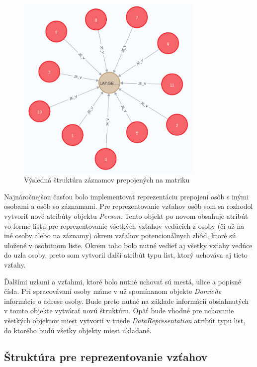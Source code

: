 \begin{figure}[H]
    \centering
    \includegraphics[width=0.8\textwidth]{obrazky-figures/matrika.png}
    \caption{Výsledná štruktúra záznamov prepojených na matriku}
    \label{matrika}
\end{figure}

Najnáročnejšou časťou bolo implementovať reprezentáciu prepojení osôb s inými osobami a osôb so záznamami. Pre reprezentovanie vzťahov osôb som sa rozhodol vytvoriť nové atribúty objektu \textit{Person}. Tento objekt po novom obsahuje atribút vo forme listu pre reprezentovanie všetkých vzťahov vedúcich z osoby (či už na iné osoby alebo na záznamy) okrem vzťahov potencionálnych zhôd, ktoré sú uložené v osobitnom liste. Okrem toho bolo nutné vedieť aj všetky vzťahy vedúce do uzla osoby, preto som vytvoril ďalší atribút typu list, ktorý uchováva aj tieto vzťahy.

Ďalšími uzlami a vzťahmi, ktoré bolo nutné uchovať sú mestá, ulice a popisné čísla. Pri spracovávaní osoby máme v už spomínanom objekte \textit{Domicile} informácie o adrese osoby. Bude preto nutné na základe informácií obsiahnutých v tomto objekte vytvárať novú štruktúru. Opäť bude vhodné pre uchovanie všetkých objektov miest vytvoriť v triede \textit{DataRepresentation} atribút typu list, do ktorého budú všetky objekty miest ukladané. 

\subsection{Štruktúra pre reprezentovanie vzťahov}

